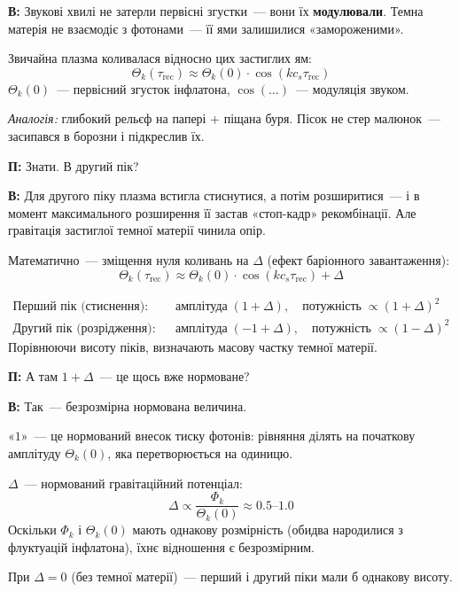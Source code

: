 \documentclass[12pt, a4paper]{article}
\newcommand{\Q}[1]{%
    \begin{questionbox}
        {\color{qcolor}\bfseries\sffamily П:} #1
    \end{questionbox}
}
\newcommand{\A}[1]{%
    \begin{answerbox}
        {\bfseries\sffamily В:} #1
    \end{answerbox}
}
\begin{document}
\A{Звукові хвилі не затерли первісні згустки~--- вони їх \textbf{модулювали}. Темна матерія не взаємодіє з фотонами~--- її ями залишилися «замороженими».

Звичайна плазма коливалася відносно цих застиглих ям:
\begin{equation}
    \Theta_k(\tau_\text{rec}) \approx \Theta_k(0)\cdot\cos\!\left(kc_s\tau_\text{rec}\right)
\end{equation}
$\Theta_k(0)$~--- первісний згусток інфлатона, $\cos(\ldots)$~--- модуляція звуком.

\textit{Аналогія:} глибокий рельєф на папері + піщана буря. Пісок не стер малюнок~--- засипався в борозни і підкреслив їх.}


\Q{Знати. В другий пік?}

\A{Для другого піку плазма встигла стиснутися, а потім розширитися~--- і в момент максимального розширення її застав «стоп-кадр» рекомбінації. Але гравітація застиглої темної матерії чинила опір.

Математично~--- зміщення нуля коливань на $\Delta$ (ефект баріонного завантаження):
\begin{equation}
    \Theta_k(\tau_\text{rec}) \approx \Theta_k(0)\cdot\cos\!\left(kc_s\tau_\text{rec}\right) + \Delta
\end{equation}

\begin{align}
    \text{Перший пік (стиснення):}\quad  &\text{амплітуда}\; (1+\Delta),\quad \text{потужність}\;\propto(1+\Delta)^2\\
    \text{Другий пік (розрідження):}\quad &\text{амплітуда}\;(-1+\Delta),\quad \text{потужність}\;\propto(1-\Delta)^2
\end{align}
Порівнюючи висоту піків, визначають масову частку темної матерії.}


\Q{А там $1+\Delta$~--- це щось вже нормоване?}

\A{Так~--- безрозмірна нормована величина.

«$1$»~--- це нормований внесок тиску фотонів: рівняння ділять на початкову амплітуду $\Theta_k(0)$, яка перетворюється на одиницю.

$\Delta$~--- нормований гравітаційний потенціал:
\begin{equation}
    \Delta \propto \frac{\Phi_k}{\Theta_k(0)} \approx 0.5\text{--}1.0
\end{equation}
Оскільки $\Phi_k$ і $\Theta_k(0)$ мають однакову розмірність (обидва народилися з флуктуацій інфлатона), їхнє відношення є безрозмірним.

При $\Delta=0$ (без темної матерії)~--- перший і другий піки мали б однакову висоту.}
\end{document}

